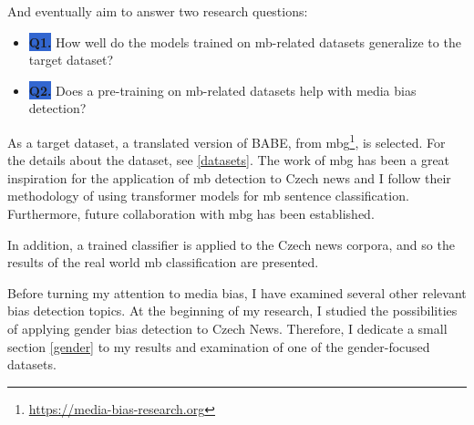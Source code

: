 \noindent And eventually aim to answer two research questions:
\begin{itemize}
    \item[] \colorbox{highlight}{\textbf{Q1.}\label{Q1}} How well do the models trained on \gls{mb}-related datasets generalize to the target dataset?
    \item[] \colorbox{highlight}{\textbf{Q2.}\label{Q2}} Does a pre-training on \gls{mb}-related datasets help with media bias detection?
\end{itemize}

As a target dataset, a translated version of BABE, from \gls{mbg}\footnote{\url{https://media-bias-research.org}}, is selected. For the details about the dataset, see \ref{datasets}. The work of \gls{mbg} has been a great inspiration for the application of \gls{mb} detection to Czech news and I follow their methodology of using transformer models for \gls{mb} sentence classification. Furthermore, future collaboration with \gls{mbg} has been established.

In addition, a trained classifier is applied to the Czech news corpora, and so the results of the real world \gls{mb} classification are presented.

Before turning my attention to media bias, I have examined several other relevant bias detection topics. At the beginning of my research, I studied the possibilities of applying gender bias detection to Czech News. Therefore, I dedicate a small section \ref{gender} to my results and examination of one of the gender-focused datasets.


\let\cleardoublepage\clearpage